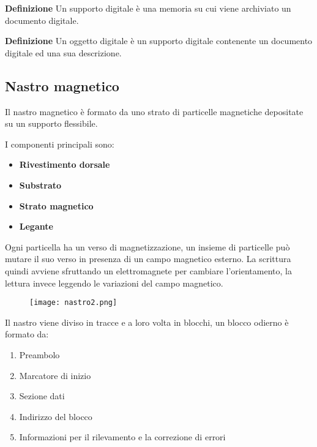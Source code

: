 \documentclass{article}
\begin{document}
\noindent\textbf{Definizione} Un supporto digitale è una memoria su cui viene archiviato un documento digitale.\newline

\noindent\textbf{Definizione} Un oggetto digitale è un supporto digitale contenente un documento digitale ed una sua descrizione.\newline

\subsection{Nastro magnetico}

Il nastro magnetico è formato da uno strato di particelle magnetiche depositate su un supporto flessibile.\newline

\noindent I componenti principali sono:
\begin{itemize}
    \item \textbf{Rivestimento dorsale}
    \item \textbf{Substrato}
    \item \textbf{Strato magnetico}
    \item \textbf{Legante}\newline
\end{itemize}

\newpage

\noindent Ogni particella ha un verso di magnetizzazione, un insieme di particelle può mutare il suo verso in presenza di un campo magnetico esterno. La scrittura quindi avviene sfruttando un elettromagnete per cambiare l'orientamento, la lettura invece leggendo le variazioni del campo magnetico.\newline

\begin{figure}[ht]
    \centering
    \texttt{[image: nastro2.png]}
    \label{fig:nastro_r}
\end{figure}

\noindent Il nastro viene diviso in tracce e a loro volta in blocchi, un blocco odierno è formato da:
\begin{enumerate}
    \item Preambolo
    \item Marcatore di inizio
    \item Sezione dati
    \item Indirizzo del blocco
    \item Informazioni per il rilevamento e la correzione di errori
\end{enumerate}
\end{document}
